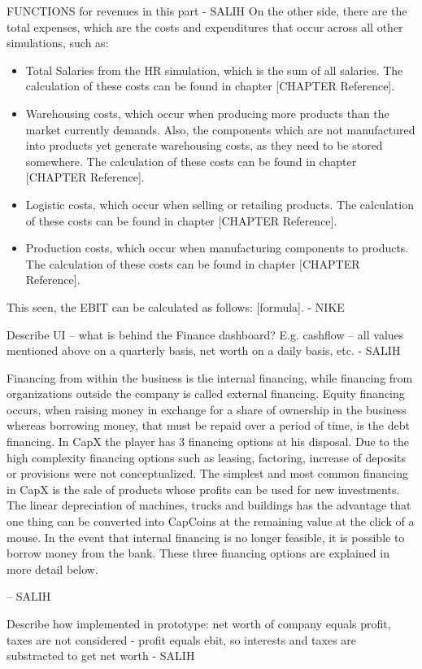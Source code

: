 FUNCTIONS for revenues in this part - SALIH
On the other side, there are the total expenses, which are the costs and expenditures that occur across all other simulations, such as:
\begin{itemize}
    \item Total Salaries from the HR simulation, which is the sum of all salaries. The calculation of these costs can be found in chapter [CHAPTER Reference].
    \item Warehousing costs, which occur when producing more products than the market currently demands. Also, the components which are not manufactured into products yet generate warehousing costs, as they need to be stored somewhere. The calculation of these costs can be found in chapter [CHAPTER Reference]. 
    \item Logistic costs, which occur when selling or retailing products. The calculation of these costs can be found in chapter [CHAPTER Reference].
    \item Production costs, which occur when manufacturing components to products. The calculation of these costs can be found in chapter [CHAPTER Reference].
\end{itemize}

This seen, the EBIT can be calculated as follows: [formula]. - NIKE

Describe UI – what is behind the Finance dashboard? E.g. cashflow – all values mentioned above on a quarterly basis, net worth on a daily basis, etc. - SALIH

Financing from within the business is the internal financing, while financing from organizations outside the company is called external financing. Equity financing occurs, when raising money in exchange for a share of ownership in the business whereas borrowing money, that must be repaid over a period of time, is the debt financing. 
In CapX the player has 3 financing options at his disposal. Due to the high complexity financing options such as leasing, factoring, increase of deposits or provisions were not conceptualized. 
The simplest and most common financing in CapX is the sale of products whose profits can be used for new investments. The linear depreciation of machines, trucks and buildings has the advantage that one thing can be converted into CapCoins at the remaining value at the click of a mouse.
In the event that internal financing is no longer feasible, it is possible to borrow money from the bank. These three financing options are explained in more detail below.

– SALIH

Describe how implemented in prototype: net worth of company equals profit, taxes are not considered - profit equals ebit, so interests and taxes are substracted to get net worth - SALIH